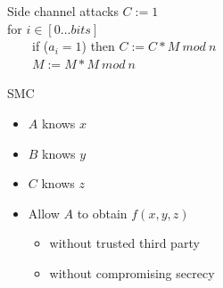\documentclass{beamer}
\begin{document}
\begin{frame}{Side channel attacks}
      $C:=1$\\
      for $i \in [0\dots bits]$\\
      \ \ \ \ if ($a_i=1$) then $C:= C * M\ mod\ n$\\
      \ \ \ \ $M:= M*M\ mod\ n$
\end{frame}


\begin{frame}{SMC}
  \begin{itemize}
      \item $A$ knows $x$
      \item $B$ knows $y$
      \item $C$ knows $z$
      \item Allow $A$ to obtain $f(x,y,z)$
        \begin{itemize}
          \item without trusted third party
          \item without compromising secrecy
        \end{itemize}
  \end{itemize}
\end{frame}
\end{document}
